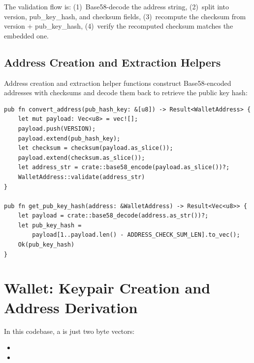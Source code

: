 \begin{checkpointbox}
The validation flow is: (1)~Base58-decode the address string, (2)~split into version, pub\_key\_hash, and checksum fields, (3)~recompute the checksum from version + pub\_key\_hash, (4)~verify the recomputed checksum matches the embedded one.
\end{checkpointbox}

\subsection{Address Creation and Extraction Helpers}
\label{sec:address-helpers}

Address creation and extraction helper functions construct Base58-encoded addresses with checksums and decode them back to retrieve the public key hash:

\begin{listing}[htbp]
\caption{Address creation and extraction ()}
\label{lst:ch14-convert-address}
\begin{verbatim}
pub fn convert_address(pub_hash_key: &[u8]) -> Result<WalletAddress> {
    let mut payload: Vec<u8> = vec![];
    payload.push(VERSION);
    payload.extend(pub_hash_key);
    let checksum = checksum(payload.as_slice());
    payload.extend(checksum.as_slice());
    let address_str = crate::base58_encode(payload.as_slice())?;
    WalletAddress::validate(address_str)
}

pub fn get_pub_key_hash(address: &WalletAddress) -> Result<Vec<u8>> {
    let payload = crate::base58_decode(address.as_str())?;
    let pub_key_hash =
        payload[1..payload.len() - ADDRESS_CHECK_SUM_LEN].to_vec();
    Ok(pub_key_hash)
}
\end{verbatim}
\end{listing}

\section{Wallet: Keypair Creation and Address Derivation}
\label{sec:wallet-keypair}

In this codebase, a  is just two byte vectors:

\begin{itemize}
  \item {}
  \item {}
\end{itemize}

